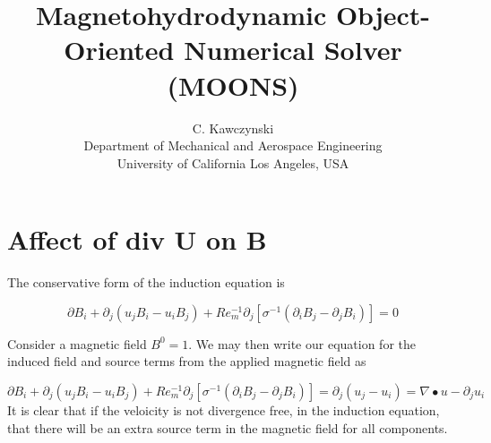 \documentclass[11pt]{article}
\begin{document}
\doublespacing
\title{Magnetohydrodynamic Object-Oriented Numerical Solver (MOONS)}
\author{C. Kawczynski \\
Department of Mechanical and Aerospace Engineering \\
University of California Los Angeles, USA\\
}
\maketitle

\section{Affect of div U on B}
The conservative form of the induction equation is

\begin{equation}
\partial B_i + \partial_j (u_j B_i - u_i B_j) + Re_m^{-1} \partial_j \left[ 
\sigma^{-1} \left( \partial_i B_j - \partial_j B_i \right)
\right] = 0
\end{equation}

Consider a magnetic field $B^0 = 1$. We may then write our equation for the induced field and source terms from the applied magnetic field as

\begin{equation}
\partial B_i + \partial_j (u_j B_i - u_i B_j) + Re_m^{-1} \partial_j \left[ 
\sigma^{-1} \left( \partial_i B_j - \partial_j B_i \right)
\right] = 
\partial_j (u_j - u_i) = \nabla \bullet u - \partial_j u_i
\end{equation}
It is clear that if the veloicity is not divergence free, in the induction equation, that there will be an extra source term in the magnetic field for all components.
\end{document}

